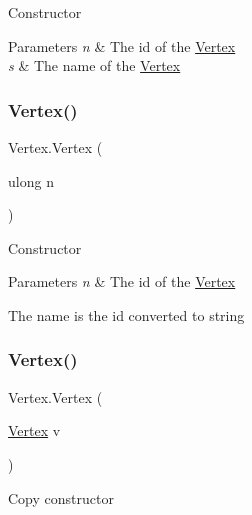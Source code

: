 Constructor 


\begin{DoxyParams}{Parameters}
{\em n} & The id of the \hyperlink{structVertex}{Vertex}\\
\hline
{\em s} & The name of the \hyperlink{structVertex}{Vertex}\\
\hline
\end{DoxyParams}
\mbox{\label{structVertex_af92b09621107bf55baa66090464699d8}} 
\subsubsection{\texorpdfstring{Vertex()}{Vertex()}\hspace{0.1cm}{\footnotesize\ttfamily [2/3]}}
{\footnotesize\ttfamily Vertex.\+Vertex (\begin{DoxyParamCaption}\item[{ulong}]{n }\end{DoxyParamCaption})\hspace{0.3cm}{\ttfamily [inline]}}



Constructor 


\begin{DoxyParams}{Parameters}
{\em n} & The id of the \hyperlink{structVertex}{Vertex}\\
\hline
\end{DoxyParams}


The name is the id converted to string\mbox{\label{structVertex_a209f95274618f0de8d70e83dabf87d62}} 
\subsubsection{\texorpdfstring{Vertex()}{Vertex()}\hspace{0.1cm}{\footnotesize\ttfamily [3/3]}}
{\footnotesize\ttfamily Vertex.\+Vertex (\begin{DoxyParamCaption}\item[{\hyperlink{structVertex}{Vertex}}]{v }\end{DoxyParamCaption})\hspace{0.3cm}{\ttfamily [inline]}}



Copy constructor 


